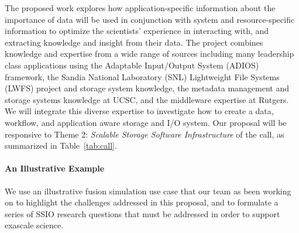 The proposed work explores how application-specific information about the
importance of data will be used in conjunction with system and
resource-specific information to optimize the scientists' experience in
interacting with, and extracting knowledge and insight from their data.
%
The project combines knowledge and expertise 
from a wide range of sources including many leadership class applications using the Adaptable Input/Output System (ADIOS) framework,
the Sandia National Laboratory (SNL) Lightweight File Systems (LWFS) project and storage system knowledge, the metadata
management and storage systems knowledge at UCSC, and the middleware expertise
at Rutgers. We will integrate this diverse expertise to investigate how to create
a data, workflow, and application aware storage and I/O system.
%
Our proposal will be responsive to Theme 2: {\em Scalable Storage Software Infrastructure} of the call, as summarized in Table~\ref{tab:call}.

%
\paragraph{An Illustrative Example}
We use an illustrative fusion simulation use case that our team as been working on to highlight the challenges addressed in this proposal, and to 
formulate a series of SSIO research questions that must be addressed in order to support exascale science.

